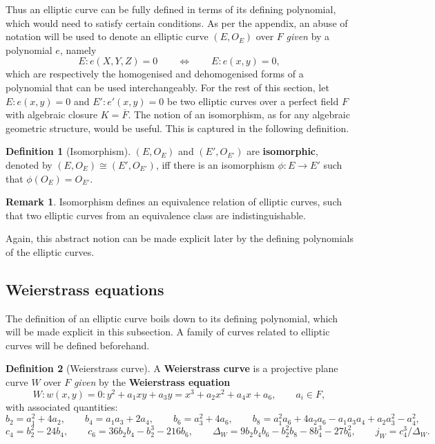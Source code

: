 \documentclass{article}
\newcommand{\rb}[1]{\left( #1 \right)}
\theoremstyle{definition}\newtheorem*{definition}{Definition}
\theoremstyle{definition}\newtheorem*{example}{Example}
\theoremstyle{definition}\newtheorem*{remark}{Remark}
\begin{document}
Thus an elliptic curve can be fully defined in terms of its defining polynomial, which would need to satisfy certain conditions. As per the appendix, an abuse of notation will be used to denote an elliptic curve $ \rb{E, O_E} $ over $ F $ \emph{given} by a polynomial $ e $, namely
$$ E : e\rb{X, Y, Z} = 0 \qquad \iff \qquad E : e\rb{x, y} = 0, $$
which are respectively the homogenised and dehomogenised forms of a polynomial that can be used interchangeably. For the rest of this section, let $ E : e\rb{x, y} = 0 $ and $ E' : e'\rb{x, y} = 0 $ be two elliptic curves over a perfect field $ F $ with algebraic closure $ K = \overline{F} $. The notion of an isomorphism, as for any algebraic geometric structure, would be useful. This is captured in the following definition.

\begin{definition}[Isomorphism]
$ \rb{E, O_E} $ and $ \rb{E', O_{E'}} $ are \textbf{isomorphic}, denoted by $ \rb{E, O_E} \cong \rb{E', O_{E'}} $, iff there is an isomorphism $ \phi : E \to E' $ such that $ \phi\rb{O_E} = O_{E'} $.
\end{definition}

\begin{remark}
Isomorphism defines an equivalence relation of elliptic curves, such that two elliptic curves from an equivalence class are indistinguishable.
\end{remark}

Again, this abstract notion can be made explicit later by the defining polynomials of the elliptic curves.

\pagebreak

\subsection{Weierstrass equations}

The definition of an elliptic curve boils down to its defining polynomial, which will be made explicit in this subsection. A family of curves related to elliptic curves will be defined beforehand.

\begin{definition}[Weierstrass curve]
A \textbf{Weierstrass curve} is a projective plane curve $ W $ over $ F $ \emph{given} by the \textbf{Weierstrass equation}
$$ W : w\rb{x, y} = 0 : y^2 + a_1xy + a_3y = x^3 + a_2x^2 + a_4x + a_6, \qquad a_i \in F, $$
with associated quantities:
$$ b_2 = a_1^2 + 4a_2, \qquad b_4 = a_1a_3 + 2a_4, \qquad b_6 = a_3^2 + 4a_6, \qquad b_8 = a_1^2a_6 + 4a_2a_6 - a_1a_3a_4 + a_2a_3^2 - a_4^2, $$
$$ c_4 = b_2^2 - 24b_4 , \qquad c_6 = 36b_2b_4 - b_2^3 - 216b_6, \qquad \Delta_W = 9b_2b_4b_6 - b_2^2b_8 - 8b_4^3 - 27b_6^2, \qquad j_W = c_4^3 / \Delta_W. $$
\end{definition}
\end{document}
